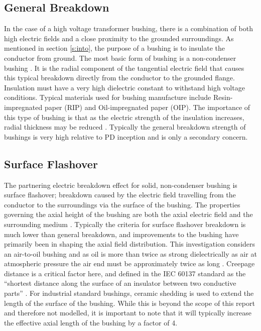 \subsection{General Breakdown }  %
In the case of a high voltage transformer bushing, there is a combination of both high electric fields and a close proximity to the grounded surroundings. 
As mentioned in section \ref{s:into}, the purpose of a bushing is to insulate the conductor from ground. 
The most basic form of bushing is a non-condenser bushing \cite{HVEngandTesting}. 
It is the radial component of the tangential electric field that causes this typical breakdown directly from the conductor to the grounded flange. 
Insulation must have a very high dielectric constant to withstand high voltage conditions.
Typical materials used for bushing manufacture include Resin-impregnated paper (RIP) and Oil-impregnated paper (OIP). 
The importance of this type of bushing is that as the electric strength of the insulation increases, radial thickness may be reduced \cite{HVEngandTesting}. 
Typically the general breakdown strength of bushings is very high relative to PD inception and is only a secondary concern.

\subsection{Surface Flashover}
The partnering electric breakdown effect for solid, non-condenser bushing is surface flashover; breakdown caused by the electric field travelling from the conductor to the surroundings via the surface of the bushing. 
The properties governing the axial height of the bushing are both the axial electric field and the surrounding medium \cite{HVEngandTesting}.
Typically the criteria for surface flashover breakdown is much lower than general breakdown, and improvements to the bushing have primarily been in shaping the axial field distribution. 
This investigation considers an air-to-oil bushing and as oil is more than twice as strong dielectrically as air at atmospheric pressure the air end must be approximately twice as long \cite{harlow2004electric}.
Creepage distance is a critical factor here, and defined in the IEC 60137 standard as the ``shortest distance along the surface of an insulator between two conductive parts'' \cite{IEC60137}.
For industrial standard bushings, ceramic shedding is used to extend the length of the surface of the bushing. 
While this is beyond the scope of this report and therefore not modelled, it is important to note that it will typically increase the effective axial length of the bushing by a factor of 4.

